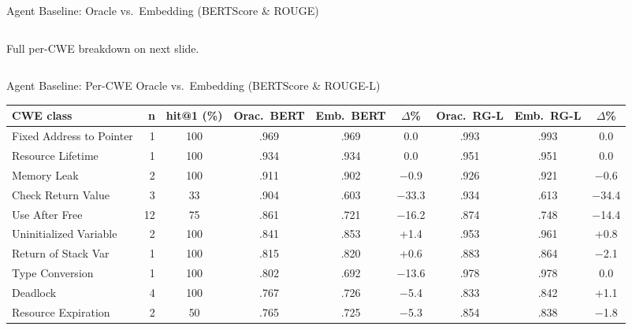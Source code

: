 \documentclass[aspectratio=169,10pt]{beamer}
\newcommand{\chit}[1]{\cellcolor{hit!30} #1}
\newcommand{\cmiss}[1]{\cellcolor{miss!25} #1}
\newcommand{\cwarn}[1]{\cellcolor{warn!30} #1}
\begin{document}
\begin{frame}{Agent Baseline: Oracle vs.\ Embedding (BERTScore \& ROUGE)}
\begin{columns}[T]
\begin{column}{0.47\textwidth}
  \vspace{0.4em}
  {\scriptsize
  \textcolor{c1}{}
  Full per-CWE breakdown on next slide.}

\end{column}
\end{columns}
\end{frame}


\begin{frame}{Agent Baseline: Per-CWE Oracle vs.\ Embedding (BERTScore \& ROUGE-L)}

  \centering
  \vspace{-0.2em}
  {\tiny
  \renewcommand{\arraystretch}{1.15}
  \setlength{\tabcolsep}{2.5pt}
  \begin{tabular}{l r c c c c c c c}
    \toprule
    \textbf{CWE class}
      & \textbf{n}
      & \textbf{hit@1 (\%)}
      & \textbf{Orac.\ BERT}
      & \textbf{Emb.\ BERT}
      & \textbf{$\Delta$\%}
      & \textbf{Orac.\ RG-L}
      & \textbf{Emb.\ RG-L}
      & \textbf{$\Delta$\%} \\
    \midrule
    \rowcolor{hit!8}
    Fixed Address to Pointer          & 1  & \chit{100}  & .969 & .969 & 0.0            & .993 & .993 & 0.0 \\
    Resource Lifetime                 & 1  & \chit{100}  & .934 & .934 & 0.0            & .951 & .951 & 0.0 \\
    Memory Leak                       & 2  & \chit{100}  & .911 & .902 & $-$0.9         & .926 & .921 & $-$0.6 \\
    Check Return Value                & 3  & \cwarn{33}  & .904 & .603 & \cmiss{$-$33.3}& .934 & .613 & \cmiss{$-$34.4} \\
    Use After Free                    & 12 & \cwarn{75}  & .861 & .721 & \cmiss{$-$16.2}& .874 & .748 & \cmiss{$-$14.4} \\
    Uninitialized Variable            & 2  & \chit{100}  & .841 & .853 & \chit{+1.4}   & .953 & .961 & \chit{+0.8} \\
    Return of Stack Var               & 1  & \chit{100}  & .815 & .820 & +0.6           & .883 & .864 & $-$2.1 \\
    Type Conversion                   & 1  & \chit{100}  & .802 & .692 & \cmiss{$-$13.6}& .978 & .978 & 0.0 \\
    \midrule
    Deadlock                          & 4  & \chit{100}  & .767 & .726 & $-$5.4         & .833 & .842 & +1.1 \\
    Resource Expiration               & 2  & \cwarn{50}  & .765 & .725 & $-$5.3         & .854 & .838 & $-$1.8 \\

\end{tabular}}
\end{frame}
\end{document}
